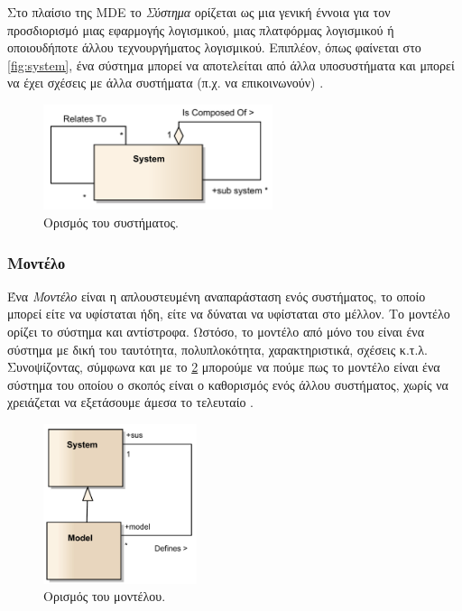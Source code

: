 Στο πλαίσιο της MDE το \textit{Σύστημα} ορίζεται ως μια γενική έννοια για τον προσδιορισμό μιας εφαρμογής λογισμικού, μιας πλατφόρμας λογισμικού ή οποιουδήποτε άλλου τεχνουργήματος λογισμικού. Επιπλέον, όπως φαίνεται στο \autoref{fig:system}, ένα σύστημα μπορεί να αποτελείται από άλλα υποσυστήματα και μπορεί να έχει σχέσεις με άλλα συστήματα (π.χ. να επικοινωνούν) \cite{bib:rodrigues_2015}.

\begin{figure}[!ht]
	\centering
	\includegraphics[width=0.6\textwidth]{./images/chapter3/system.png}
	\caption{Ορισμός του συστήματος.}
	\label{fig:system}
\end{figure}

\subsubsection{Μοντέλο}
\label{subsubsec:model}

Ένα \textit{Μοντέλο} είναι η απλουστευμένη αναπαράσταση ενός συστήματος, το οποίο μπορεί είτε να υφίσταται ήδη, είτε να δύναται να υφίσταται στο μέλλον. Το μοντέλο ορίζει το σύστημα και αντίστροφα. Ωστόσο, το μοντέλο από μόνο του είναι ένα σύστημα με δική του ταυτότητα, πολυπλοκότητα, χαρακτηριστικά, σχέσεις κ.τ.λ. Συνοψίζοντας, σύμφωνα και με το \ref{fig:model} μπορούμε να πούμε πως το μοντέλο είναι ένα σύστημα του οποίου ο σκοπός είναι ο καθορισμός ενός άλλου συστήματος, χωρίς να χρειάζεται να εξετάσουμε άμεσα το τελευταίο \cite{bib:rodrigues_2015}.

\begin{figure}[!ht]
	\centering
	\includegraphics[width=0.4\textwidth]{./images/chapter3/model.png}
	\caption{Ορισμός του μοντέλου.}
	\label{fig:model}
\end{figure}

